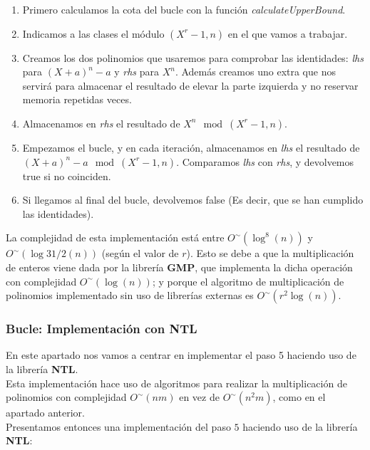 \begin{enumerate}
	\item Primero calculamos la cota del bucle con la función \textit{calculateUpperBound}.
	
	\item Indicamos a las clases el módulo $(X^r - 1, n)$ en el que vamos a trabajar.
	
	\item Creamos los dos polinomios que usaremos para comprobar las identidades: \textit{lhs} para $(X + a)^n - a$ y \textit{rhs} para $X^n$. Además creamos uno extra que nos servirá para almacenar el resultado de elevar la parte izquierda y no reservar memoria repetidas veces.
	
	\item Almacenamos en \textit{rhs} el resultado de $X^n \mod(X^r - 1, n)$.
	
	\item Empezamos el bucle, y en cada iteración, almacenamos en \textit{lhs} el resultado de $(X + a)^n - a \mod(X^r - 1, n)$. Comparamos \textit{lhs} con \textit{rhs}, y devolvemos true si no coinciden.
	
	\item Si llegamos al final del bucle, devolvemos false (Es decir, que se han cumplido las identidades).
\end{enumerate}

La complejidad de esta implementación está entre $O^\sim(\log^8(n))$ y $O^\sim(\log{31/2}(n))$ (según el valor de $r$). Esto se debe a que la multiplicación de enteros viene dada por la librería \textbf{GMP}, que implementa la dicha operación con complejidad $O^\sim(\log(n))$; y porque el algoritmo de multiplicación de polinomios implementado sin uso de librerías externas es $O^\sim(r^2\log(n))$.

\subsubsection{Bucle: Implementación con NTL}

En este apartado nos vamos a centrar en implementar el paso 5 haciendo uso de la librería \textbf{NTL}.\\

Esta implementación hace uso de algoritmos para realizar la multiplicación de polinomios con complejidad $O^\sim(nm)$ en vez de $O^\sim(n^2m)$, como en el apartado anterior.\\

Presentamos entonces una implementación del paso $5$ haciendo uso de la librería \textbf{NTL}:\\

